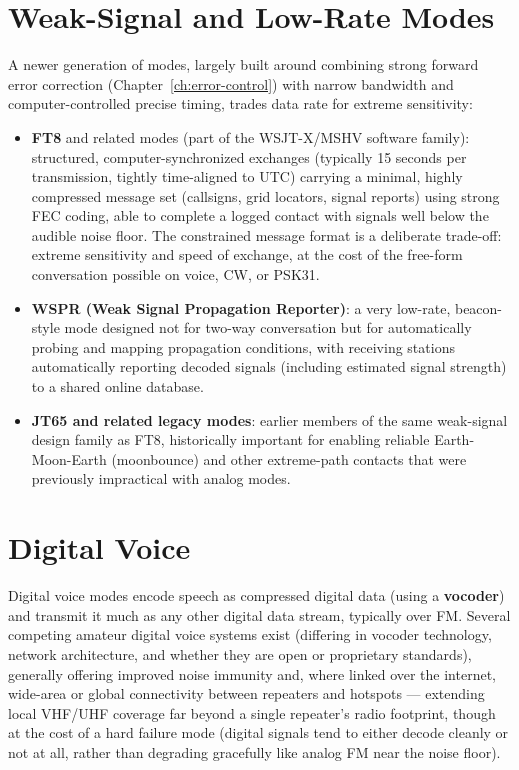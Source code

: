 \section{Weak-Signal and Low-Rate Modes}

A newer generation of modes, largely built around combining strong
forward error correction (Chapter~\ref{ch:error-control}) with narrow
bandwidth and computer-controlled precise timing, trades data rate for
extreme sensitivity:

\begin{itemize}
\item \textbf{FT8} and related modes (part of the WSJT-X/MSHV software
family): structured, computer-synchronized exchanges (typically 15
seconds per transmission, tightly time-aligned to UTC) carrying a
minimal, highly compressed message set (callsigns, grid locators,
signal reports) using strong FEC coding, able to complete a logged
contact with signals well below the audible noise floor. The
constrained message format is a deliberate trade-off: extreme
sensitivity and speed of exchange, at the cost of the free-form
conversation possible on voice, CW, or PSK31.
\item \textbf{WSPR (Weak Signal Propagation Reporter)}: a very
low-rate, beacon-style mode designed not for two-way conversation but
for automatically probing and mapping propagation conditions, with
receiving stations automatically reporting decoded signals (including
estimated signal strength) to a shared online database.
\item \textbf{JT65 and related legacy modes}: earlier members of the
same weak-signal design family as FT8, historically important for
enabling reliable Earth-Moon-Earth (moonbounce) and other
extreme-path contacts that were previously impractical with analog
modes.
\end{itemize}

\section{Digital Voice}

Digital voice modes encode speech as compressed digital data (using a
\textbf{vocoder}) and transmit it much as any other digital data stream,
typically over FM. Several competing amateur digital voice systems
exist (differing in vocoder technology, network architecture, and
whether they are open or proprietary standards), generally offering
improved noise immunity and, where linked over the internet, wide-area
or global connectivity between repeaters and hotspots --- extending
local VHF/UHF coverage far beyond a single repeater's radio footprint,
though at the cost of a hard failure mode (digital signals tend to
either decode cleanly or not at all, rather than degrading gracefully
like analog FM near the noise floor).

